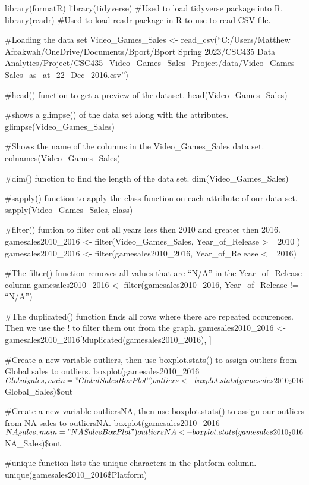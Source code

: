 \documentclass[
]{article}
\author{}
\date{\vspace{-2.5em}}
\begin{document}
library(formatR) library(tidyverse) \#Used to load tidyverse package
into R. library(readr) \#Used to load readr package in R to use to read
CSV file.

\#Loading the data set Video\_Games\_Sales \textless-
read\_csv(``C:/Users/Matthew Afoakwah/OneDrive/Documents/Bport/Bport
Spring 2023/CSC435 Data
Analytics/Project/CSC435\_Video\_Games\_Sales\_Project/data/Video\_Games\_Sales\_as\_at\_22\_Dec\_2016.csv'')

\#head() function to get a preview of the dataset.
head(Video\_Games\_Sales)

\#shows a glimpse() of the data set along with the attributes.
glimpse(Video\_Games\_Sales)

\#Shows the name of the columns in the Video\_Games\_Sales data set.
colnames(Video\_Games\_Sales)

\#dim() function to find the length of the data set.
dim(Video\_Games\_Sales)

\#sapply() function to apply the class function on each attribute of our
data set. sapply(Video\_Games\_Sales, class)

\#filter() funtion to filter out all years less then 2010 and greater
then 2016. gamesales2010\_2016 \textless- filter(Video\_Games\_Sales,
Year\_of\_Release \textgreater= 2010 ) gamesales2010\_2016 \textless-
filter(gamesales2010\_2016, Year\_of\_Release \textless= 2016)

\#The filter() function removes all values that are ``N/A'' in the
Year\_of\_Release column gamesales2010\_2016 \textless-
filter(gamesales2010\_2016, Year\_of\_Release != ``N/A'')

\#The duplicated() function finds all rows where there are repeated
occurences. Then we use the ! to filter them out from the graph.
gamesales2010\_2016 \textless-
gamesales2010\_2016{[}!duplicated(gamesales2010\_2016), {]}

\#Create a new variable outliers, then use boxplot.stats() to assign
outliers from Global sales to outliers.
boxplot(gamesales2010\_2016\(Global_Sales, main = "Global Sales BoxPlot") outliers <- boxplot.stats(gamesales2010_2016\)Global\_Sales)\$out

\#Create a new variable outliersNA, then use boxplot.stats() to assign
our outliers from NA sales to outliersNA.
boxplot(gamesales2010\_2016\(NA_Sales, main = "NA Sales BoxPlot") outliersNA <- boxplot.stats(gamesales2010_2016\)NA\_Sales)\$out

\#unique function lists the unique characters in the platform column.
unique(gamesales2010\_2016\$Platform)
\end{document}
